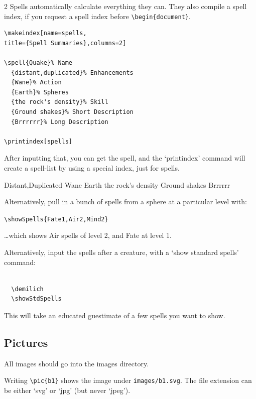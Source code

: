 \documentclass[a4paper,openany]{book}
\begin{document}
\begin{multicols}{2}
Spells automatically calculate everything they can.
They also compile a spell index, if you request a spell index before \verb"\begin{document}".

\begin{verbatim}
\makeindex[name=spells,
title={Spell Summaries},columns=2]

\spell{Quake}% Name
  {distant,duplicated}% Enhancements
  {Wane}% Action
  {Earth}% Spheres
  {the rock's density}% Skill
  {Ground shakes}% Short Description
  {Brrrrrr}% Long Description

\printindex[spells]
\end{verbatim}

After inputting that, you can get the spell, and the `printindex' command will create a spell-list by using a special index, just for spells.

  {Distant,Duplicated}%
  {Wane}%
  {Earth}%
  {the rock's density}%
  {Ground shakes}%
  {Brrrrrr}%

Alternatively, pull in a bunch of spells from a sphere at a particular level with:

\verb"\showSpells{Fate1,Air2,Mind2}"


\ldots which shows Air spells of level 2, and Fate at level 1.

Alternatively, input the spells after a creature, with a `show standard spells' command:

\begin{verbatim}

  \demilich
  \showStdSpells

\end{verbatim}

This will take an educated guestimate of a few spells you want to show.

\demilich

\showStdSpells

\subsection{Pictures}


All images should go into the images directory.

Writing \verb"\pic{b1}" shows the image under \verb"images/b1.svg".
The file extension can be either `svg' or `jpg' (but never `jpeg').


\end{multicols}
\end{document}
